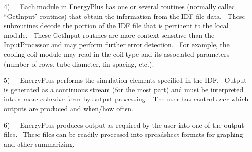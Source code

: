 4)~~~Each module in EnergyPlus has one or several routines (normally called ``GetInput'' routines) that obtain the information from the IDF file data.~ These subroutines decode the portion of the IDF file that is pertinent to the local module.~ These GetInput routines are more context sensitive than the InputProcessor and may perform further error detection.~ For example, the cooling coil module may read in the coil type and its associated parameters (number of rows, tube diameter, fin spacing, etc.).

5)~~~EnergyPlus performs the simulation elements specified in the IDF.~ Output is generated as a continuous stream (for the most part) and must be interpreted into a more cohesive form by output processing.~ The user has control over which outputs are produced and when/how often.

6)~~~EnergyPlus produces output as required by the user into one of the output files.~ These files can be readily processed into spreadsheet formats for graphing and other summarizing.
